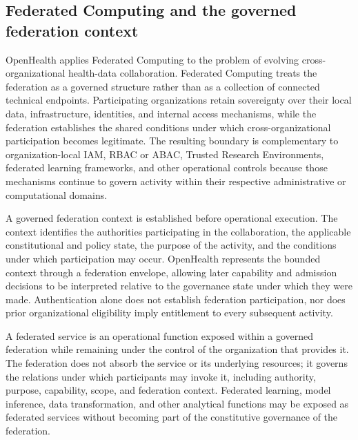 \documentclass[twoside,11pt]{article}
\begin{document}

\subsection{Federated Computing and the governed federation context}
OpenHealth applies Federated Computing to the problem of evolving cross-organizational health-data collaboration. Federated Computing treats the federation as a governed structure rather than as a collection of connected technical endpoints. Participating organizations retain sovereignty over their local data, infrastructure, identities, and internal access mechanisms, while the federation establishes the shared conditions under which cross-organizational participation becomes legitimate. The resulting boundary is complementary to organization-local IAM, RBAC or ABAC, Trusted Research Environments, federated learning frameworks, and other operational controls because those mechanisms continue to govern activity within their respective administrative or computational domains.

A governed federation context is established before operational execution. The context identifies the authorities participating in the collaboration, the applicable constitutional and policy state, the purpose of the activity, and the conditions under which participation may occur. OpenHealth represents the bounded context through a federation envelope, allowing later capability and admission decisions to be interpreted relative to the governance state under which they were made. Authentication alone   does not establish federation participation, nor does prior organizational eligibility imply entitlement to every subsequent activity.

A federated service is an operational function exposed within a governed federation while remaining under the control of the organization that provides it. The federation does not absorb the service or its underlying resources; it governs the relations under which participants may invoke it, including authority, purpose, capability, scope, and federation context. Federated learning, model inference, data transformation, and other analytical functions may   be exposed as federated services without becoming part of the constitutive governance of the federation.
\end{document}
